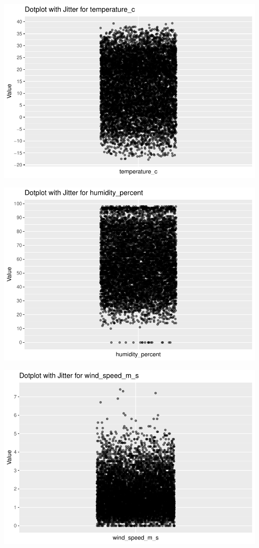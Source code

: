 \documentclass[
  11pt,
  letterpaper,
]{article}
\begin{document}
\begin{center}\includegraphics[width=1.2\linewidth,]{Final_Project_files/figure-latex/Univariate Outlier Check-2} \end{center}

\begin{center}\includegraphics[width=1.2\linewidth,]{Final_Project_files/figure-latex/Univariate Outlier Check-3} \end{center}

\begin{center}\includegraphics[width=1.2\linewidth,]{Final_Project_files/figure-latex/Univariate Outlier Check-4} \end{center}
\end{document}
